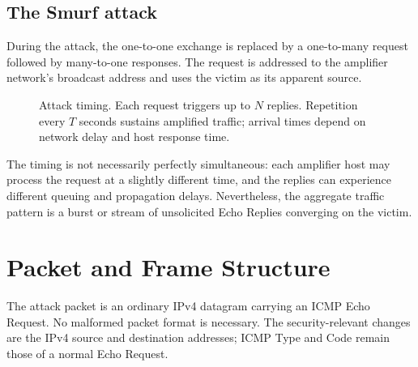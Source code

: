 \documentclass[12pt,a4paper]{article}
\begin{document}
\subsection{The Smurf attack}
During the attack, the one-to-one exchange is replaced by a one-to-many request followed by many-to-one responses. The request is addressed to the amplifier network's broadcast address and uses the victim as its apparent source.

\begin{figure}[H]
\centering

\caption{Attack timing. Each request triggers up to $N$ replies. Repetition every $T$ seconds sustains amplified traffic; arrival times depend on network delay and host response time.}
\end{figure}

The timing is not necessarily perfectly simultaneous: each amplifier host may process the request at a slightly different time, and the replies can experience different queuing and propagation delays. Nevertheless, the aggregate traffic pattern is a burst or stream of unsolicited Echo Replies converging on the victim.

\section{Packet and Frame Structure}
The attack packet is an ordinary IPv4 datagram carrying an ICMP Echo Request. No malformed packet format is necessary. The security-relevant changes are the IPv4 source and destination addresses; ICMP Type and Code remain those of a normal Echo Request.
\end{document}
